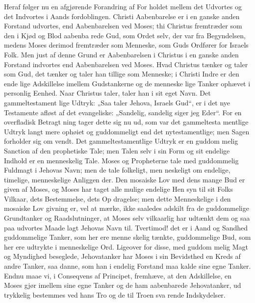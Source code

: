 \documentclass[12pt]{book}
\newcommand{\opage}[1]{\marginnote{\footnotesize\textit{[#1]}}}
\begin{document}
Heraf følger nu en afgjørende Forandring af For\-%
holdet mellem det Udvortes og det Indvortes i Aands\-%
fordoblingen. Christi Aabenbarelse er i en ganske anden
Forstand udvortes, end Aabenbarelsen ved Moses; thi
Christus fremtræder som den i Kjød og Blod aabenba\-%
rede Gud, som Ordet selv, der var fra Begyndelsen,
medens Moses derimod fremtræder som Menneske, som
Guds Ordfører for Israels Folk. Men just af denne
Grund er Aabenbarelsen i Christus i en ganske anden
Forstand indvortes end Aabenbarelsen ved Moses. Hvad
\opage{191}\setcounter{footnote}{0}%
Christus tænker og taler som Gud, det tænker og taler
han tillige som Menneske; i Christi Indre er den ende\-%
lige Adskillelse imellem Gudstankerne og de menneske\-%
lige Tanker ophævet i personlig Eenhed. Naar Christus
taler, taler han i sit eget Navn. Det gammeltestament\-%
lige Udtryk: „Saa taler Jehova, Israels Gud“, er i det
nye Testamente afløst af det evangeliske: „Sandelig,
sandelig siger jeg Eder“. For en overfladisk Betragt\-%
ning tager dette sig nu ud, som var det gammeltesta\-%
mentlige Udtryk langt mere ophøiet og guddommeligt
end det nytestamentlige; men Sagen forholder sig om\-%
vendt. Det gammeltestamentlige Udtryk er en guddom\-%
melig Sanction af den prophetiske Tale; men Talen selv
i sin Form og sit endelige Indhold er en menneskelig
Tale. Moses og Propheterne tale med guddommelig
Fuldmagt i Jehovas Navn; men de tale folkeligt, men\-%
neskeligt om endelige, timelige, menneskelige Anliggen\-%
der. Den mosaiske Lov med dens mange Bud er given
af Moses, og Moses har taget alle mulige endelige Hen\-%
syn til sit Folks Vilkaar, dets Bestemmelse, dets Op\-%
dragelse; men dette Menneskelige i den mosaiske Lov\-%
givning er, vel at mærke, ikke saaledes adskilt fra de
guddommelige Grundtanker og Raadslutninger, at Moses
selv vilkaarlig har udtænkt dem og saa paa udvortes
Maade lagt Jehovas Navn til. Tvertimod! det er i Aand
og Sandhed guddommelige Tanker, som her ere menne\-%
skelig tænkte, guddommelige Bud, som her ere udtrykte
i menneskelige Ord. Ligeover for disse, med guddom\-%
melig Magt og Myndighed beseglede, Jehovatanker har
Moses i sin Bevidsthed en Kreds af andre Tanker, saa\-%
danne, som han i endelig Forstand maa kalde sine egne
Tanker. Endnu maae vi, i Conseqvens af Principet,
fremhæve, at den Adskillelse, en Moses gjør imellem sine
egne Tanker og de ham aabenbarede Jehovatanker, ud\-%
\opage{192}\setcounter{footnote}{0}%
trykkelig bestemmes ved hans Tro og de til Troen sva\-%
rende Indskydelser.
\end{document}

